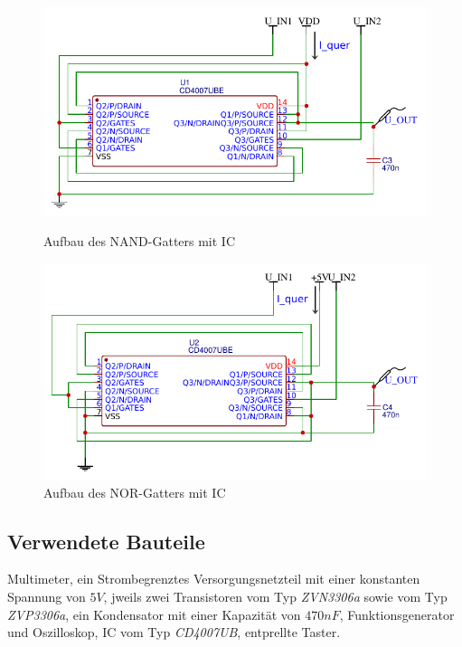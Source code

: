 \documentclass[11pt, a4paper]{article}
\begin{document}
\begin{figure}[htb]
    \centering
    \begin{minipage}[t]{0.45\linewidth}
        \centering
        \includegraphics[width=\linewidth]{IC_NAND.pdf}
        \caption{Aufbau des NAND-Gatters mit IC}
        \label{aufbauNANDIC}
    \end{minipage}%
    \hfill
    \begin{minipage}[t]{0.45\linewidth}
        \centering
        \includegraphics[width=\linewidth]{IC_NOR.pdf}
        \caption{Aufbau des NOR-Gatters mit IC}
        \label{aufbauNORIC}
    \end{minipage}
\end{figure}
\subsection*{Verwendete Bauteile}
Multimeter, ein Strombegrenztes Versorgungsnetzteil mit einer konstanten Spannung von $5V$, jweils zwei Transistoren vom Typ \textit{ZVN3306a} sowie vom Typ \textit{ZVP3306a}, ein Kondensator mit einer Kapazität von $470nF$, Funktionsgenerator und Oszilloskop, IC vom Typ \textit{CD4007UB}, entprellte Taster.
\end{document}
